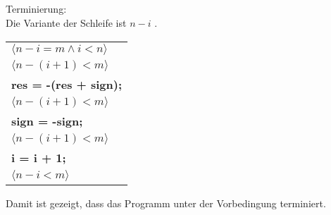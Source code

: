 \documentclass[12pt]{article}
\begin{document}
\subsection{}
\begin{center}
    Terminierung:\\
    Die Variante der Schleife ist $n-i$ .
    \bigbreak
    \begin{tabular}{l}
        $\langle n-i=m \wedge i < n \rangle$\\
        $\langle n-(i+1)<m \rangle$\\
        \quad \textbf{res = -(res + sign);}\\
        $\langle n-(i+1)<m \rangle$\\
        \quad \textbf{sign = -sign;}\\
        $\langle n-(i+1)<m \rangle$\\
        \quad \textbf{i = i + 1;}\\
        $\langle n-i<m \rangle$
    \end{tabular}
    \bigbreak
    Damit ist gezeigt, dass das Programm unter der Vorbedingung terminiert.
\end{center}

\pagebreak
\end{document}
